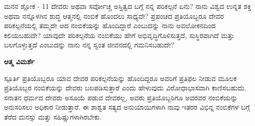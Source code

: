 \begin{mananam}{\mananamfont ಮನನ ಶ್ಲೋಕ - \textenglish{11}}
\footnotesize \mananamtext ದೇವರು ಅಥವಾ ಸರ್ವೋಚ್ಚ ಅಸ್ತಿತ್ವದ ಬಗ್ಗೆ ನನ್ನ ಪರಿಕಲ್ಪನೆ ಏನು? ನಾನು ವಿಶ್ವದ ಉನ್ನತ ಶಕ್ತಿ ಅಥವಾ ನನ್ನೊಳಗಿನ ಶುದ್ಧ ಆತ್ಮನಲ್ಲಿ ನಂಬಿಕೆ ಹೊಂದಲು ಸಾಧ್ಯವೇ? ಪ್ರಪಂಚದ ಪ್ರತಿಯೊಬ್ಬರೂ ದೇವರ ಪರಿಕಲ್ಪನೆಯಲ್ಲಿ ತಮ್ಮದೇ ಆದ ನಂಬಿಕೆಯನ್ನು ಹೊಂದಿದ್ದಾರೆ ಎಂಬುದನ್ನು ನಾನು ಅವಲೋಕನದಿಂದ ಕಲಿಯಬಹುದೇ? ಯಾವುದೇ ಪರಿಕಲ್ಪನೆಯ ನಂಬಿಕೆಯು ಹೇಗೆ ಅಭಿವೃದ್ಧಿಗೊಳಿಸುತ್ತದೆ, ಸುಸ್ಥಿರವಾಗಿದೆ ಮತ್ತು ಬಲಗೊಳ್ಳುತ್ತದೆ ಎಂಬುದನ್ನು ನಾನು ನನ್ನ ಸ್ವಂತ ಜೀವನದಲ್ಲಿ ಗಮನಿಸಬಹುದೇ?
\end{mananam}
\WritingHand\enspace\textbf{ಆತ್ಮ ವಿಮರ್ಶೆ}\\
\begin{inspiration}{\mananamfont ಸ್ಪೂರ್ತಿ}
\footnotesize \mananamtext ಪ್ರತಿಯೊಬ್ಬರೂ ಯಾವ ದೇವರ ಪರಿಕಲ್ಪನೆಯನ್ನು ಹೊಂದಿದ್ದರೂ ಅವರಿಗೆ ಪ್ರತಿಫಲ ನೀಡುವ ಮೂಲಕ ಪ್ರತಿಯೊಬ್ಬರ ನಂಬಿಕೆಯನ್ನು ದೇವರು ಬಲಪಡಿಸುತ್ತಾರೆ ಎಂದು ಹೇಳುವುದು ವಿರೋಧಾಭಾಸವಾಗಿ ಕಾಣಿಸಬಹುದು. ಸನಾತನ ಧರ್ಮದ ದೇವರು ಅಸೂಯೆ ಪಡುವ ದೇವರಲ್ಲ, ಅವರು ಪ್ರತಿಯೊಬ್ಬರಿಗೂ ಅವರವರ ನಂಬಿಕೆಯನ್ನು ಅನುಸರಿಸಲು ಅಧಿಕಾರ ನೀಡುತ್ತಾರೆ. ಈ ಶಾಶ್ವತ ಸತ್ಯದ ಅನುಯಾಯಿಗಳಾಗಿ ನಾವು ಇತರರ ವಿಭಿನ್ನ ನಂಬಿಕೆಗಳ ಬಗ್ಗೆ ತೆರೆದ ಮನಸ್ಸು ಮತ್ತು ಸಹಿಷ್ಣುಗಳಾಗಿರಬೇಕು.
\end{inspiration}
\newpage

